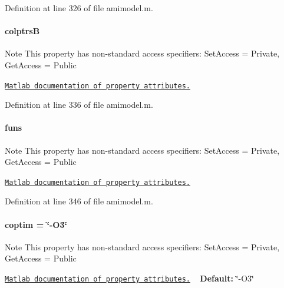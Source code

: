 Definition at line 326 of file amimodel.\+m.

\hypertarget{classamimodel_a3a4891c5565b544dd7d4362dbbfaadf7}{}
\paragraph[{colptrs\+B}]{\setlength{\rightskip}{0pt plus 5cm}colptrs\+B}\label{classamimodel_a3a4891c5565b544dd7d4362dbbfaadf7}
\begin{DoxyNote}{Note}
This property has non-\/standard access specifiers\+: {\ttfamily Set\+Access = Private, Get\+Access = Public} 

\href{http://www.mathworks.com/help/matlab/matlab_oop/property-attributes.html}{\tt Matlab documentation of property attributes.} 
\end{DoxyNote}


Definition at line 336 of file amimodel.\+m.

\hypertarget{classamimodel_af80b2560853c3df2b09fef2a198cf5b8}{}
\paragraph[{funs}]{\setlength{\rightskip}{0pt plus 5cm}funs}\label{classamimodel_af80b2560853c3df2b09fef2a198cf5b8}
\begin{DoxyNote}{Note}
This property has non-\/standard access specifiers\+: {\ttfamily Set\+Access = Private, Get\+Access = Public} 

\href{http://www.mathworks.com/help/matlab/matlab_oop/property-attributes.html}{\tt Matlab documentation of property attributes.} 
\end{DoxyNote}


Definition at line 346 of file amimodel.\+m.

\hypertarget{classamimodel_ad99abcd270ac97546c46292ebc6c2e0a}{}
\paragraph[{coptim}]{\setlength{\rightskip}{0pt plus 5cm}coptim = \char`\"{}-\/O3\char`\"{}}\label{classamimodel_ad99abcd270ac97546c46292ebc6c2e0a}
\begin{DoxyNote}{Note}
This property has non-\/standard access specifiers\+: {\ttfamily Set\+Access = Private, Get\+Access = Public} 

\href{http://www.mathworks.com/help/matlab/matlab_oop/property-attributes.html}{\tt Matlab documentation of property attributes.} ~\newline
{\bfseries Default\+:} \char`\"{}-\/\+O3\char`\"{} 
\end{DoxyNote}


